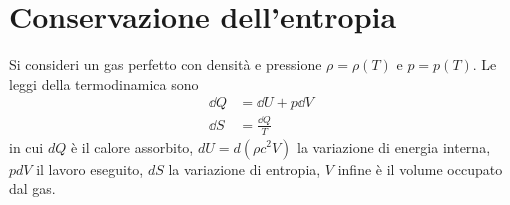 \section{Conservazione dell'entropia}

Si consideri un gas perfetto con densità e pressione $\rho= \rho(T)$ e $p=p(T)$.
Le leggi della termodinamica sono
\begin{subequations}
  \label{leggi_termo}
  \begin{align}
    \dd Q &= \dd U+p\dd V \\
    \dd S &= \frac{\dd Q}{T}
  \end{align}
\end{subequations}
in cui $dQ$ è il calore assorbito, $dU=d(\rho c^2 V)$ la variazione di energia
interna, $pdV$ il lavoro eseguito, $dS$ la variazione di entropia, $V$ infine è
il volume occupato dal gas.

